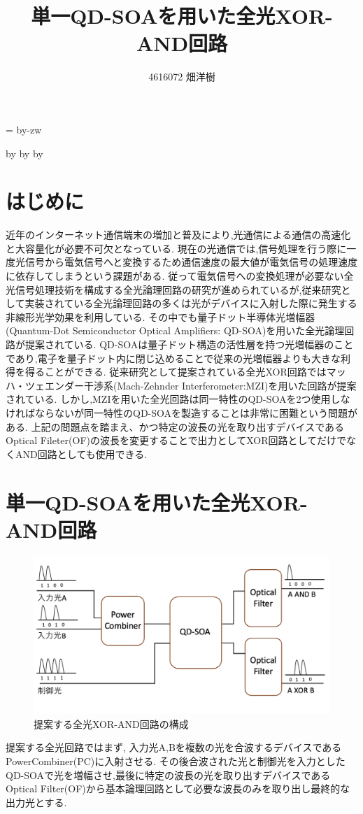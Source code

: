 \documentclass[dvipdfmx]{ujarticle}
\title{単一QD-SOAを用いた全光XOR-AND回路}
\author{4616072 畑洋樹}
\makeatletter
\def\mojiparline#1{
    \newcounter{mpl}
    \setcounter{mpl}{#1}
    \@tempdima=\linewidth
    \advance\@tempdima by-\value{mpl}zw
    \addtocounter{mpl}{-1}
    \divide\@tempdima by \value{mpl}
    \advance\kanjiskip by\@tempdima
    \advance\parindent by\@tempdima
}
\makeatother
\begin{document}
\mojiparline{43}
\maketitle

\section{はじめに}
近年のインターネット通信端末の増加と普及により,光通信による通信の高速化と大容量化が必要不可欠となっている.
現在の光通信では,信号処理を行う際に一度光信号から電気信号へと変換するため通信速度の最大値が電気信号の処理速度に依存してしまうという課題がある.
従って電気信号への変換処理が必要ない全光信号処理技術を構成する全光論理回路の研究が進められているが,従来研究として実装されている全光論理回路の多くは光がデバイスに入射した際に発生する非線形光学効果を利用している.
その中でも量子ドット半導体光増幅器(Quantum-Dot Semiconductor Optical Amplifiers: QD-SOA)を用いた全光論理回路が提案されている.
QD-SOAは量子ドット構造の活性層を持つ光増幅器のことであり,電子を量子ドット内に閉じ込めることで従来の光増幅器よりも大きな利得を得ることができる.
従来研究として提案されている全光XOR回路ではマッハ・ツェエンダー干渉系(Mach-Zehnder Interferometer:MZI)を用いた回路が提案されている.
しかし,MZIを用いた全光回路は同一特性のQD-SOAを2つ使用しなければならないが同一特性のQD-SOAを製造することは非常に困難という問題がある.
上記の問題点を踏まえ、かつ特定の波長の光を取り出すデバイスであるOptical Fileter(OF)の波長を変更することで出力としてXOR回路としてだけでなくAND回路としても使用できる.

\section{単一QD-SOAを用いた全光XOR-AND回路}

\begin{figure}[H]
  \begin{center}
    \includegraphics[width=15cm]{images/kairo2.png}
    \caption{提案する全光XOR-AND回路の構成}
  \end{center}
\end{figure}
提案する全光回路ではまず, 入力光A,Bを複数の光を合波するデバイスであるPowerCombiner(PC)に入射させる.
その後合波された光と制御光を入力としたQD-SOAで光を増幅させ,最後に特定の波長の光を取り出すデバイスであるOptical Filter(OF)から基本論理回路として必要な波長のみを取り出し最終的な出力光とする.
\end{document}
